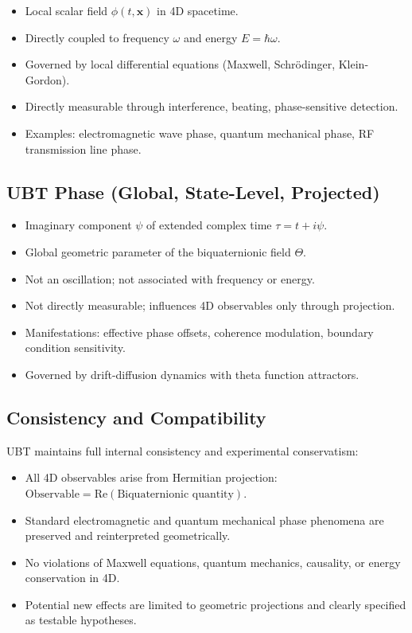 \documentclass[12pt]{article}
\begin{document}
\begin{itemize}
\item Local scalar field $\phi(t, \mathbf{x})$ in 4D spacetime.
\item Directly coupled to frequency $\omega$ and energy $E = \hbar\omega$.
\item Governed by local differential equations (Maxwell, Schrödinger, Klein-Gordon).
\item Directly measurable through interference, beating, phase-sensitive detection.
\item Examples: electromagnetic wave phase, quantum mechanical phase, RF transmission line phase.
\end{itemize}

\subsection{UBT Phase (Global, State-Level, Projected)}

\begin{itemize}
\item Imaginary component $\psi$ of extended complex time $\tau = t + i\psi$.
\item Global geometric parameter of the biquaternionic field $\Theta$.
\item Not an oscillation; not associated with frequency or energy.
\item Not directly measurable; influences 4D observables only through projection.
\item Manifestations: effective phase offsets, coherence modulation, boundary condition sensitivity.
\item Governed by drift-diffusion dynamics with theta function attractors.
\end{itemize}

\subsection{Consistency and Compatibility}

UBT maintains full internal consistency and experimental conservatism:
\begin{itemize}
\item All 4D observables arise from Hermitian projection: $\text{Observable} = \text{Re}(\text{Biquaternionic quantity})$.
\item Standard electromagnetic and quantum mechanical phase phenomena are preserved and reinterpreted geometrically.
\item No violations of Maxwell equations, quantum mechanics, causality, or energy conservation in 4D.
\item Potential new effects are limited to geometric projections and clearly specified as testable hypotheses.
\end{itemize}
\end{document}
